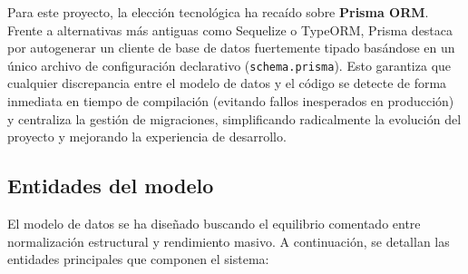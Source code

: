 Para este proyecto, la elección tecnológica ha recaído sobre \textbf{Prisma ORM}. Frente a alternativas más antiguas como Sequelize o TypeORM, Prisma destaca por autogenerar un cliente de base de datos fuertemente tipado basándose en un único archivo de configuración declarativo (\texttt{schema.prisma}). Esto garantiza que cualquier discrepancia entre el modelo de datos y el código se detecte de forma inmediata en tiempo de compilación (evitando fallos inesperados en producción) y centraliza la gestión de migraciones, simplificando radicalmente la evolución del proyecto y mejorando la experiencia de desarrollo.

\subsection{Entidades del modelo}
El modelo de datos se ha diseñado buscando el equilibrio comentado entre normalización estructural y rendimiento masivo. A continuación, se detallan las entidades principales que componen el sistema:

